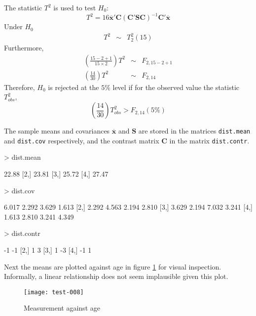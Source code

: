\documentclass[a4paper,11pt]{article}
\begin{document}
The statistic $T^2$ is used to test $H_0$:
\begin{equation}
\label{tsquared}
T^2 = 16\mathbf{\overline{x}'C(C'SC)}^{-1}\mathbf{C'\overline{x}}
\end{equation}
Under $H_0$
\begin{eqnarray}
T^2                                      & \sim & T^2_2(15)
\end{eqnarray}
Furthermore,
\begin{eqnarray}
\left(\frac{15-2+1}{15\times2}\right)T^2 & \sim & F_{2,15-2+1} \nonumber \\
\label{distresult}
\left(\frac{14}{30}\right)T^2            & \sim & F_{2,14}
\end{eqnarray}
Therefore, $H_0$ is rejected at the $5\%$ level if for the observed value the statistic $T_{obs}^2$,
\begin{equation*}
\left(\frac{14}{30}\right)T_{obs}^2 > F_{2,14}(5\%)
\end{equation*}

The sample means and covariances $\mathbf{\overline{x}}$ and $\mathbf S$ are stored in the matrices \texttt{dist.mean} and \texttt{dist.cov} respectively, and the contrast matrix $\mathbf C$ in the matrix \texttt{dist.contr}.
\begin{Schunk}
\begin{Sinput}
> dist.mean
\end{Sinput}
\begin{Soutput}
      [,1]
[1,] 22.88
[2,] 23.81
[3,] 25.72
[4,] 27.47
\end{Soutput}
\begin{Sinput}
> dist.cov
\end{Sinput}
\begin{Soutput}
      [,1]  [,2]  [,3]  [,4]
[1,] 6.017 2.292 3.629 1.613
[2,] 2.292 4.563 2.194 2.810
[3,] 3.629 2.194 7.032 3.241
[4,] 1.613 2.810 3.241 4.349
\end{Soutput}
\begin{Sinput}
> dist.contr
\end{Sinput}
\begin{Soutput}
     [,1] [,2]
[1,]   -1   -1
[2,]    1    3
[3,]    1   -3
[4,]   -1    1
\end{Soutput}
\end{Schunk}

Next the means are plotted against age in figure \ref{fig:measurementplot} for visual inspection. Informally, a linear relationship does not seem implausible given this plot.
\begin{figure}[t]
\begin{centering}
\texttt{[image: test-008]}
\label{fig:measurementplot}
\caption{Measurement against age}
\end{centering}
\end{figure}\\
\end{document}

